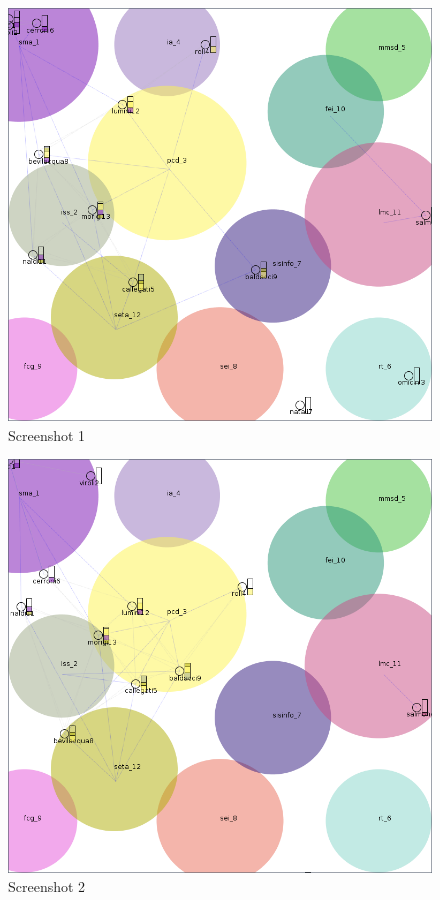 \begin{figure}[!h]
  \centering
  \includegraphics[width=13cm]{./imgs/screen1.png}
  \caption{Screenshot 1}
  \label{fig:screens1}
\end{figure}

\begin{figure}[!h]
  \centering
  \includegraphics[width=13cm]{./imgs/screen2.png}
  \caption{Screenshot 2}
  \label{fig:screens2}
\end{figure}

